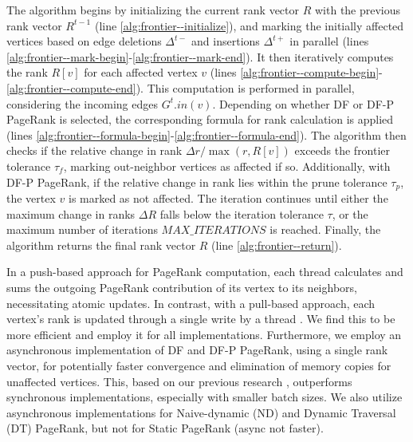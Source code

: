 The algorithm begins by initializing the current rank vector $R$ with the previous rank vector $R^{t-1}$ (line \ref{alg:frontier--initialize}), and marking the initially affected vertices based on edge deletions $\Delta^{t-}$ and insertions $\Delta^{t+}$ in parallel (lines \ref{alg:frontier--mark-begin}-\ref{alg:frontier--mark-end}). It then iteratively computes the rank $R[v]$ for each affected vertex $v$ (lines \ref{alg:frontier--compute-begin}-\ref{alg:frontier--compute-end}). This computation is performed in parallel, considering the incoming edges $G^t.in(v)$. Depending on whether DF or DF-P PageRank is selected, the corresponding formula for rank calculation is applied (lines \ref{alg:frontier--formula-begin}-\ref{alg:frontier--formula-end}). The algorithm then checks if the relative change in rank $\Delta r / \max(r, R[v])$ exceeds the frontier tolerance $\tau_f$, marking out-neighbor vertices as affected if so. Additionally, with DF-P PageRank, if the relative change in rank lies within the prune tolerance $\tau_p$, the vertex $v$ is marked as not affected. The iteration continues until either the maximum change in ranks $\Delta R$ falls below the iteration tolerance $\tau$, or the maximum number of iterations $MAX\_ITERATIONS$ is reached. Finally, the algorithm returns the final rank vector $R$ (line \ref{alg:frontier--return}).

In a push-based approach for PageRank computation, each thread calculates and sums the outgoing PageRank contribution of its vertex to its neighbors, necessitating atomic updates. In contrast, with a pull-based approach, each vertex's rank is updated through a single write by a thread \cite{verstraaten2015quantifying}. We find this to be more efficient and employ it for all implementations. Furthermore, we employ an asynchronous implementation of DF and DF-P PageRank, using a single rank vector, for potentially faster convergence and elimination of memory copies for unaffected vertices. This, based on our previous research \cite{sahu2024incrementally}, outperforms synchronous implementations, especially with smaller batch sizes. We also utilize asynchronous implementations for Naive-dynamic (ND) and Dynamic Traversal (DT) PageRank, but not for Static PageRank (async not faster).
